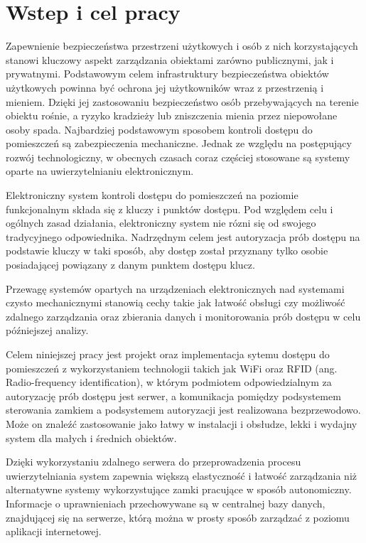 \chapter{Wstep i cel pracy}

Zapewnienie bezpieczeństwa przestrzeni użytkowych i osób z nich korzystających stanowi kluczowy aspekt zarządzania obiektami zarówno publicznymi, jak i prywatnymi. Podstawowym celem infrastruktury bezpieczeństwa obiektów użytkowych powinna być ochrona jej użytkowników wraz z przestrzenią i mieniem. Dzięki jej zastosowaniu bezpieczeństwo osób przebywających na terenie obiektu rośnie, a ryzyko kradzieży lub zniszczenia mienia przez niepowołane osoby spada. Najbardziej podstawowym sposobem kontroli dostępu do pomieszczeń są zabezpieczenia mechaniczne. Jednak ze względu na postępujący rozwój technologiczny, w obecnych czasach coraz częściej stosowane są systemy oparte na uwierzytelnianiu elektronicznym.

Elektroniczny system kontroli dostępu do pomieszczeń na poziomie funkcjonalnym składa się z kluczy i punktów dostępu. Pod względem celu i ogólnych zasad działania, elektroniczny system nie rózni się od swojego tradycyjnego odpowiednika. Nadrzędnym celem jest autoryzacja prób dostępu na podstawie kluczy w taki sposób, aby dostęp został przyznany tylko osobie posiadającej powiązany z danym punktem dostępu klucz.

Przewagę systemów opartych na urządzeniach elektronicznych nad systemami czysto mechanicznymi stanowią cechy takie jak łatwość obsługi czy możliwość zdalnego zarządzania oraz zbierania danych i monitorowania prób dostępu w celu późniejszej analizy.

Celem niniejszej pracy jest projekt oraz implementacja sytemu dostępu do pomieszczeń z wykorzystaniem technologii takich jak WiFi oraz RFID (ang. Radio-frequency identification), w którym podmiotem odpowiedzialnym za autoryzację prób dostępu jest serwer, a komunikacja pomiędzy podsystemem sterowania zamkiem a podsystemem autoryzacji jest realizowana bezprzewodowo. Może on znaleźć zastosowanie jako łatwy w instalacji i obsłudze, lekki i wydajny system dla małych i średnich obiektów.

Dzięki wykorzystaniu zdalnego serwera do przeprowadzenia procesu uwierzytelniania system zapewnia większą elastyczność i łatwość zarządzania niż alternatywne systemy wykorzystujące zamki pracujące w sposób autonomiczny. Informacje o uprawnieniach przechowywane są w centralnej bazy danych, znajdującej się na serwerze, którą można w prosty sposób zarządzać z poziomu aplikacji internetowej.

